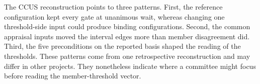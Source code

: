 The CCUS reconstruction points to three patterns. First, the reference configuration kept every gate at unanimous wait, whereas changing one threshold-side input could produce binding configurations. Second, the common appraisal inputs moved the interval edges more than member disagreement did. Third, the five preconditions on the reported basis shaped the reading of the thresholds. These patterns come from one retrospective reconstruction and may differ in other projects. They nonetheless indicate where a committee might focus before reading the member-threshold vector.
